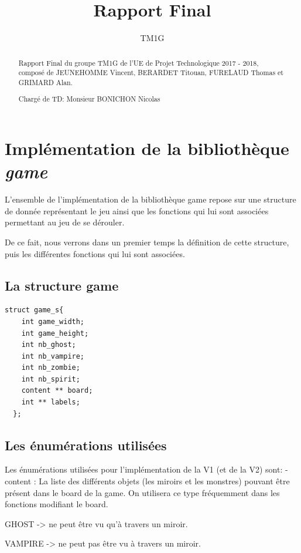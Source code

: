 \documentclass[12]{article}
\title{Rapport Final}
\author{TM1G}
\begin{document}
\maketitle

\begin{abstract}
  Rapport Final du groupe TM1G de l'UE de Projet Technologique 2017 - 2018, composé de JEUNEHOMME Vincent, BERARDET Titouan, FURELAUD Thomas et GRIMARD Alan. \\
\begin{center}
  Chargé de TD: Monsieur BONICHON Nicolas
\end{center}
\end{abstract}

\tableofcontents



\section{Implémentation de la bibliothèque \textit{game}}
L'ensemble de l'implémentation de la bibliothèque game repose sur une structure de donnée représentant le jeu ainsi que les fonctions qui lui sont associées permettant au jeu de se dérouler.

De ce fait, nous verrons dans un premier temps la définition de cette structure, puis les différentes fonctions qui lui sont associées.
\subsection{La structure game}
\begin{lstlisting}[style=CStyle]
  struct game_s{
    int game_width;
    int game_height;
    int nb_ghost;
    int nb_vampire;
    int nb_zombie;
    int nb_spirit;
    content ** board;
    int ** labels;
  };
\end{lstlisting}

\subsection{Les énumérations utilisées}
 Les énumérations utilisées pour l'implémentation de la V1 (et de la V2) sont:
 -content : La liste des différents objets (les miroirs et les monstres) pouvant être présent dans le board de la game. On utilisera ce type fréquemment dans les fonctions modifiant le board.
 
 GHOST -> ne peut être vu qu'à travers un miroir.
 
     VAMPIRE -> ne peut pas être vu à travers un miroir.
     
\end{document}
